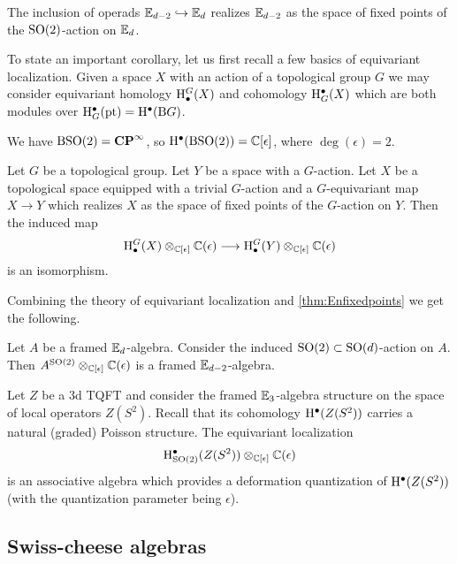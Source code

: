 \begin{thm}
The inclusion of operads $\mathbb{E}_{d-2}\hookrightarrow \mathbb{E}_d$ realizes $\mathbb{E}_{d-2}$ as the space of fixed points of the $\mathrm{SO}(2)$-action on $\mathbb{E}_d$.
\label{thm:Enfixedpoints}
\end{thm}

To state an important corollary, let us first recall a few basics of equivariant localization. Given a space $X$ with an action of a topological group $G$ we may consider equivariant homology $\mathrm{H}^G_\bullet(X)$ and cohomology $\mathrm{H}^\bullet_G(X)$ which are both modules over $\mathrm{H}^\bullet_G(\mathrm{pt})=\mathrm{H}^\bullet(\mathrm{B} G)$.

\begin{example}
We have $\mathrm{B}\mathrm{SO}(2)=\mathbf{CP}^\infty$, so $\mathrm{H}^\bullet(\mathrm{B}\mathrm{SO}(2))=\mathbb{C}[\epsilon]$, where $\deg(\epsilon)=2$.
\end{example}

\begin{thm}
Let $G$ be a topological group. Let $Y$ be a space with a $G$-action. Let $X$ be a topological space equipped with a trivial $G$-action and a $G$-equivariant map $X\rightarrow Y$ which realizes $X$ as the space of fixed points of the $G$-action on $Y$. Then the induced map
\[\mathrm{H}^G_\bullet(X)\otimes_{\mathbb{C}[\epsilon]} \mathbb{C}(\epsilon) \longrightarrow \mathrm{H}^G_\bullet(Y)\otimes_{\mathbb{C}[\epsilon]} \mathbb{C}(\epsilon)\]
is an isomorphism.
\end{thm}

Combining the theory of equivariant localization and \ref{thm:Enfixedpoints} we get the following.

\begin{thm}
Let $A$ be a framed $\mathbb{E}_d$-algebra. Consider the induced $\mathrm{SO}(2)\subset\mathrm{SO}(d)$-action on $A$. Then $A^{\mathrm{SO}(2)}\otimes_{\mathbb{C}[\epsilon]} \mathbb{C}(\epsilon)$ is a framed $\mathbb{E}_{d-2}$-algebra.
\end{thm}

\begin{example}
Let $Z$ be a 3d TQFT and consider the framed $\mathbb{E}_3$-algebra structure on the space of local operators $Z(S^2)$. Recall that its cohomology $\mathrm{H}^\bullet(Z(S^2))$ carries a natural (graded) Poisson structure. The equivariant localization
\[\mathrm{H}^\bullet_{\mathrm{SO}(2)}(Z(S^2))\otimes_{\mathbb{C}[\epsilon]} \mathbb{C}(\epsilon)\]
is an associative algebra which provides a deformation quantization of $\mathrm{H}^\bullet(Z(S^2))$ (with the quantization parameter being $\epsilon$).
\end{example}

\subsection{Swiss-cheese algebras}

